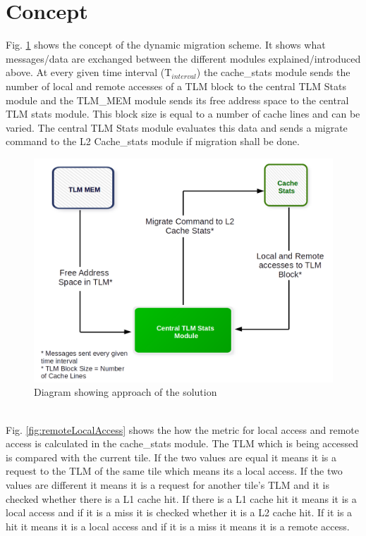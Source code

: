 \documentclass{listhesis}
\begin{document}
\section{Concept}
Fig. \ref{fig:approachOfSolution} shows the concept of the dynamic migration scheme. It shows what messages/data are exchanged between the different modules explained/introduced above. At every given time interval (T$_{interval}$) the cache{\_}stats module sends the number of local and remote accesses of a TLM block to the  central TLM Stats module and the TLM{\_}MEM module sends its free address space to the central TLM stats module. This block size is equal to a number of cache lines and can be varied. The central TLM Stats module evaluates this data and sends a migrate command to the L2 Cache{\_}stats module if migration shall be done.\\
\begin{figure}
  \includegraphics[width=0.7\linewidth]{approachOfSolution.png}
  \centering
  \caption{Diagram showing approach of the solution}
  \label{fig:approachOfSolution}
\end{figure}
\\
Fig. \ref{fig:remoteLocalAccess} shows the how the metric for local access and remote access is calculated in the cache{\_}stats module. The TLM which is being accessed is compared with the current tile. If the two values are equal it means it is a request to the TLM of the same tile which means its a local access. If the two values are different it means it is a request for another tile's TLM and it is checked whether there is a L1 cache hit. If there is a L1 cache hit it means it is a local access and if it is a miss it is checked whether it is a L2 cache hit. If it is a hit it means it is a local access and if it is a miss it means it is a remote access.\\
\end{document}
